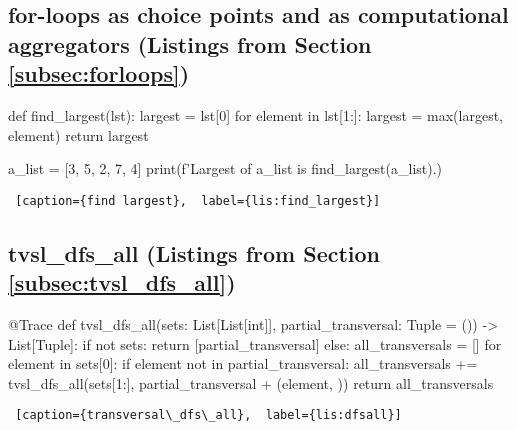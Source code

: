 \subsection{\textbf{for}-loops as choice points and as computational aggregators (Listings from Section \ref{subsec:forloops})} \label{appsubsec:forloops}

\begin{minipage}{\linewidth}  \largev \begin{python}[numbers=left]
def find_largest(lst):
    largest = lst[0]
    for element in lst[1:]:
        largest = max(largest, element)
    return largest

a_list = [3, 5, 2, 7, 4]
print(f'Largest of {a_list} is {find_largest(a_list)}.)
\end{python}
\begin{lstlisting} [caption={find largest},  label={lis:find_largest}]
\end{lstlisting}
\end{minipage}

\subsection{tvsl\_dfs\_all (Listings from Section \ref{subsec:tvsl_dfs_all})} \label{appsubsec:tvsl_dfs_all}

\begin{minipage}{\linewidth} \largev   \hrulefill
\begin{python}[numbers=left]
@Trace
def tvsl_dfs_all(sets: List[List[int]], partial_transversal: Tuple = ()) -> List[Tuple]:
  if not sets:
    return [partial_transversal]
  else:
    all_transversals = []
    for element in sets[0]:
      if element not in partial_transversal:
        all_transversals += tvsl_dfs_all(sets[1:], partial_transversal + (element, ))
    return all_transversals
\end{python}
\begin{lstlisting} [caption={transversal\_dfs\_all},  label={lis:dfsall}]
\end{lstlisting}
\end{minipage}

